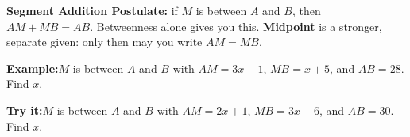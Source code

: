\documentclass[12pt]{article}
\begin{document}
\begin{formulabox}\textbf{Segment Addition Postulate:} if $M$ is between $A$ and $B$,
then $AM + MB = AB$. Betweenness alone gives you this. \textbf{Midpoint} is a stronger,
separate given: only then may you write $AM = MB$.
\end{formulabox}
\begin{examplebox}\textbf{Example:}\quad $M$ is between $A$ and $B$ with $AM = 3x - 1$,
$MB = x + 5$, and $AB = 28$. Find $x$.
\end{examplebox}
\begin{tryitbox}\textbf{Try it:}\quad $M$ is between $A$ and $B$ with $AM = 2x + 1$,
$MB = 3x - 6$, and $AB = 30$. Find $x$.\\[2pt]
\end{tryitbox}
\end{document}
